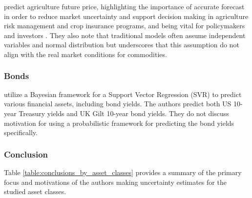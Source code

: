\textcite{li2020multivariate} predict agriculture future price, highlighting the importance of accurate forecast in order to reduce market uncertainty and support decision making in agriculture risk management and crop insurance programs, and being vital for policymakers and investors \parencite{li2020multivariate, Wang2017Performance, Ouyang2019Agricultural}. They also note that traditional models often assume independent variables and normal distribution but underscores that this assumption do not align with the real market conditions for commodities.


\subsubsection{Bonds}
\textcite{Law2017Practical} utilize a Bayesian framework for a Support Vector Regression (SVR) to predict various financial assets, including bond yields. The authors predict both US 10-year Treasury yields and UK Gilt 10-year bond yields. They do not discuss motivation for using a probabilistic framework for predicting the bond yields specifically. 






\subsubsection{Conclusion} %
Table \ref{table:conclusions_by_asset_classes} provides a summary of the primary focus and motivations of the authors making uncertainty estimates for the studied asset classes.

